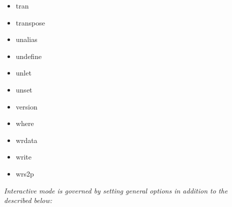{\begin{multicols}{4}
\begin{itemize}[leftmargin=0pt,label={}]
    \item tran
    \item transpose
    \item unalias
    \item undefine
    \item unlet
    \item unset
    \item version
    \item where
    \item wrdata
    \item write
    \item wrs2p
\end{itemize}\end{multicols}}

\textit{Interactive mode is governed by setting general options in addition to the  described below:}
